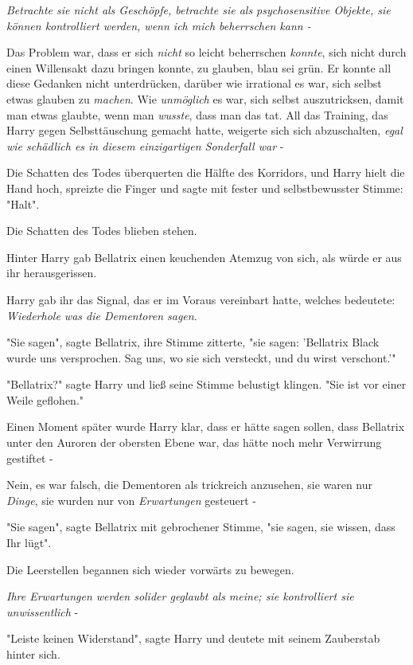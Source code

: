 {\emph{Betrachte sie nicht als Geschöpfe, betrachte sie als psychosensitive Objekte, sie können kontrolliert werden, wenn ich mich beherrschen kann -}

Das Problem war, dass er sich \emph{nicht} so leicht beherrschen \emph{konnte}, sich nicht durch einen Willensakt dazu bringen konnte, zu glauben, blau sei grün. Er konnte all diese Gedanken nicht unterdrücken, darüber wie irrational es war, sich selbst etwas glauben zu \emph{machen}. Wie \emph{unmöglich} es war, sich selbst auszutricksen, damit man etwas glaubte, wenn man \emph{wusste}, dass man das tat. All das Training, das Harry gegen Selbsttäuschung gemacht hatte, weigerte sich sich abzuschalten, \emph{egal wie schädlich es in diesem einzigartigen Sonderfall war} -

Die Schatten des Todes überquerten die Hälfte des Korridors, und Harry hielt die Hand hoch, spreizte die Finger und sagte mit fester und selbstbewusster Stimme: "Halt".

Die Schatten des Todes blieben stehen.

Hinter Harry gab Bellatrix einen keuchenden Atemzug von sich, als würde er aus ihr herausgerissen.

Harry gab ihr das Signal, das er im Voraus vereinbart hatte, welches bedeutete: \emph{Wiederhole was die Dementoren sagen}.

"Sie sagen", sagte Bellatrix, ihre Stimme zitterte, "sie sagen: 'Bellatrix Black wurde uns versprochen. Sag uns, wo sie sich versteckt, und du wirst verschont.'"

"Bellatrix?" sagte Harry und ließ seine Stimme belustigt klingen. "Sie ist vor einer Weile geflohen."

Einen Moment später wurde Harry klar, dass er hätte sagen sollen, dass Bellatrix unter den Auroren der obersten Ebene war, das hätte noch mehr Verwirrung gestiftet -

Nein, es war falsch, die Dementoren als trickreich anzusehen, sie waren nur \emph{Dinge}, sie wurden nur von \emph{Erwartungen} gesteuert -

"Sie sagen", sagte Bellatrix mit gebrochener Stimme, "sie sagen, sie wissen, dass Ihr lügt".

Die Leerstellen begannen sich wieder vorwärts zu bewegen.

\emph{Ihre Erwartungen werden solider geglaubt als meine; sie kontrolliert sie unwissentlich} -

"Leiste keinen Widerstand", sagte Harry und deutete mit seinem Zauberstab hinter sich.

}
